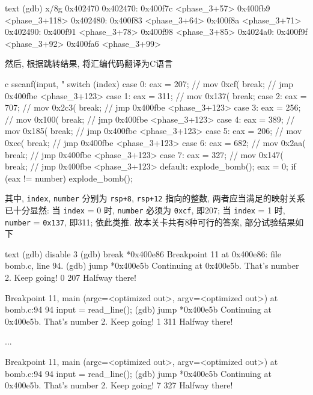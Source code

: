 \begin{code}{text}
(gdb) x/8g 0x402470
0x402470:       0x400f7c <phase_3+57>   0x400fb9 <phase_3+118>
0x402480:       0x400f83 <phase_3+64>   0x400f8a <phase_3+71>
0x402490:       0x400f91 <phase_3+78>   0x400f98 <phase_3+85>
0x4024a0:       0x400f9f <phase_3+92>   0x400fa6 <phase_3+99>
\end{code}
然后, 根据跳转结果, 将汇编代码翻译为C语言
\begin{code}{c}
    sscanf(input, "%
    switch (index) {
    case 0:
        eax = 207;      // mov 0xcf(%
        break;          // jmp 0x400fbe <phase_3+123>
    case 1:
        eax = 311;      // mov 0x137(%
        break;          
    case 2:
        eax = 707;      // mov 0x2c3(%
        break;          // jmp 0x400fbe <phase_3+123>
    case 3:
        eax = 256;      // mov 0x100(%
        break;          // jmp 0x400fbe <phase_3+123>
    case 4:
        eax = 389;      // mov 0x185(%
        break;          // jmp 0x400fbe <phase_3+123>
    case 5:
        eax = 206;      // mov 0xce(%
        break;          // jmp 0x400fbe <phase_3+123>
    case 6:
        eax = 682;      // mov 0x2aa(%
        break;          // jmp 0x400fbe <phase_3+123>
    case 7:
        eax = 327;      // mov 0x147(%
        break;          // jmp 0x400fbe <phase_3+123>
    default:
        explode_bomb(); eax = 0;
    }
    if (eax != number) explode_bomb();
\end{code}
其中, \verb|index|, \verb|number| 分别为  \verb|rsp+8|, \verb|rsp+12| 指向的整数, 两者应当满足的映射关系已十分显然: 当 \verb|index| = 0 时, \verb|number| 必须为 \verb|0xcf|, 即207; 当 \verb|index| = 1 时, \verb|number| = \verb|0x137|, 即311; 依此类推. 故本关卡共有8种可行的答案, 部分试验结果如下
\begin{code}{text}
(gdb) disable 3
(gdb) break *0x400e86
Breakpoint 11 at 0x400e86: file bomb.c, line 94.
(gdb) jump *0x400e5b
Continuing at 0x400e5b.
That's number 2.  Keep going!
0 207
Halfway there!

Breakpoint 11, main (argc=<optimized out>, argv=<optimized out>) at bomb.c:94
94          input = read_line();
(gdb) jump *0x400e5b
Continuing at 0x400e5b.
That's number 2.  Keep going!
1 311
Halfway there!

...

Breakpoint 11, main (argc=<optimized out>, argv=<optimized out>) at bomb.c:94
94          input = read_line();
(gdb) jump *0x400e5b
Continuing at 0x400e5b.
That's number 2.  Keep going!
7 327
Halfway there!
\end{code}


